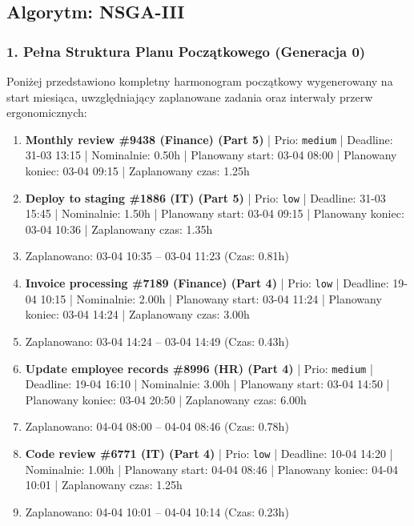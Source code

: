\vspace{0.8cm}
\subsection{Algorytm: NSGA-III}

\subsubsection*{1. Pełna Struktura Planu Początkowego (Generacja 0)}
Poniżej przedstawiono kompletny harmonogram początkowy wygenerowany na start miesiąca, uwzględniający zaplanowane zadania oraz interwały przerw ergonomicznych:

{\footnotesize
\begin{enumerate}
  \item [\textbf{14656}] \textbf{Monthly review \#9438 (Finance) (Part 5)} | Prio: \texttt{medium} | Deadline: 31-03 13:15 | Nominalnie: 0.50h | Planowany start: 03-04 08:00 | Planowany koniec: 03-04 09:15 | Zaplanowany czas: 1.25h
  \item [\textbf{14697}] \textbf{Deploy to staging \#1886 (IT) (Part 5)} | Prio: \texttt{low} | Deadline: 31-03 15:45 | Nominalnie: 1.50h | Planowany start: 03-04 09:15 | Planowany koniec: 03-04 10:36 | Zaplanowany czas: 1.35h
  \item [\textbf{PRZERWA}] Zaplanowano: 03-04 10:35 -- 03-04 11:23 (Czas: 0.81h)
  \item [\textbf{14678}] \textbf{Invoice processing \#7189 (Finance) (Part 4)} | Prio: \texttt{low} | Deadline: 19-04 10:15 | Nominalnie: 2.00h | Planowany start: 03-04 11:24 | Planowany koniec: 03-04 14:24 | Zaplanowany czas: 3.00h
  \item [\textbf{PRZERWA}] Zaplanowano: 03-04 14:24 -- 03-04 14:49 (Czas: 0.43h)
  \item [\textbf{14655}] \textbf{Update employee records \#8996 (HR) (Part 4)} | Prio: \texttt{medium} | Deadline: 19-04 16:10 | Nominalnie: 3.00h | Planowany start: 03-04 14:50 | Planowany koniec: 03-04 20:50 | Zaplanowany czas: 6.00h
  \item [\textbf{PRZERWA}] Zaplanowano: 04-04 08:00 -- 04-04 08:46 (Czas: 0.78h)
  \item [\textbf{14681}] \textbf{Code review \#6771 (IT) (Part 4)} | Prio: \texttt{low} | Deadline: 10-04 14:20 | Nominalnie: 1.00h | Planowany start: 04-04 08:46 | Planowany koniec: 04-04 10:01 | Zaplanowany czas: 1.25h
  \item [\textbf{PRZERWA}] Zaplanowano: 04-04 10:01 -- 04-04 10:14 (Czas: 0.23h)

\end{enumerate}}

